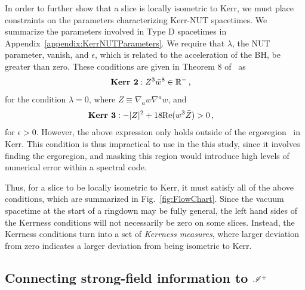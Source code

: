 In order to further show that a slice is locally isometric to Kerr, we must place constraints on the parameters characterizing Kerr-NUT spacetimes. We summarize the parameters involved in Type D spacetimes in Appendix~\ref{appendix:KerrNUTParameters}. We require that $\lambda$, the NUT parameter, vanish, and $\epsilon$, which is related to the acceleration of the BH, be greater than zero. These conditions are given in Theorem 8 of~\cite{lobo16} as
\begin{align}
\textrm{\textbf{Kerr 2}}&: Z^3 \bar{w}^8 \in \mathbb{R}^{-} \,,
\label{eq:Kerr2}
\end{align}
for the condition $\lambda = 0$, where $Z \equiv \nabla_a w \nabla^a w$, and 
\begin{align}
\textrm{\textbf{Kerr 3}}&: -|Z|^2 + 18\mathrm{Re}(w^3 \bar{Z}) > 0 \,,
\label{eq:Kerr3}
\end{align}
for $\epsilon > 0$. However, the above expression only holds outside of the ergoregion~\cite{loboprivate} in Kerr. This condition is thus impractical to use in the this study, since it involves finding the ergoregion, and masking this region would introduce high levels of numerical error within a spectral code.

 
Thus, for a slice to be locally isometric to Kerr, it must satisfy all of the above conditions, which are summarized in Fig.~\ref{fig:FlowChart}. Since the vacuum spacetime at the start of a ringdown may be fully general, the left hand sides of the Kerrness conditions will not necessarily be zero on some slices. Instead, the Kerrness conditions turn into a set of \textit{Kerrness measures}, where larger deviation from zero indicates a larger deviation from being isometric to Kerr. %

\subsection{Connecting strong-field information to $\mathscr{I^+}$}
